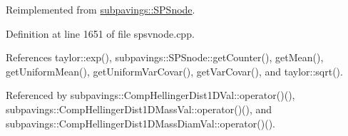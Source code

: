 \-Reimplemented from \hyperlink{classsubpavings_1_1SPSnode_afe386393d18f1e251972e959e79c3847}{subpavings\-::\-S\-P\-Snode}.



\-Definition at line 1651 of file spsvnode.\-cpp.



\-References taylor\-::exp(), subpavings\-::\-S\-P\-Snode\-::get\-Counter(), get\-Mean(), get\-Uniform\-Mean(), get\-Uniform\-Var\-Covar(), get\-Var\-Covar(), and taylor\-::sqrt().



\-Referenced by subpavings\-::\-Comp\-Hellinger\-Dist1\-D\-Val\-::operator()(), subpavings\-::\-Comp\-Hellinger\-Dist1\-D\-Mass\-Val\-::operator()(), and subpavings\-::\-Comp\-Hellinger\-Dist1\-D\-Mass\-Diam\-Val\-::operator()().


